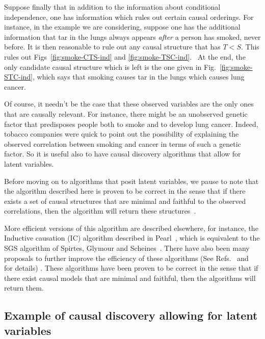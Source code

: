 \documentclass[12pt,onecolumn,nofootinbib]{revtex4-2}
\begin{document}
Suppose finally that in addition to the information about conditional
independence, one has information which rules out certain causal orderings.
For instance, in the example we are considering, suppose one has the
additional information that tar in the lungs always appears \emph{after} a
person has smoked, never before. It is then reasonable to rule out any
causal structure that has $T<S.$ This rules out Figs~\ref{fig:smoke-CTS-ind} and \ref{fig:smoke-TSC-ind}. \ At the end, the only candidate causal structure which is left is the one given in Fig.~\ref{fig:smoke-STC-ind}, which says that smoking causes tar in the lungs which causes lung cancer.

Of course, it needn't be the case that these observed variables are the only
ones that are causally relevant. For instance, there might be an unobserved genetic
factor that predisposes people both to smoke and to
develop lung cancer. Indeed, tobacco companies were quick to point out the possibility of
explaining the observed correlation between smoking and cancer in terms of
such a genetic factor. So it is useful also to have causal discovery
algorithms that allow for latent variables.

Before moving on to algorithms that posit latent variables, we pause to note
that the algorithm described here is proven to be correct in the sense
that if there exists a set of causal structures that are minimal and
faithful to the observed correlations, then the algorithm will return these structures~\cite{Wermuth1983}.


More efficient versions of this algorithm are described elsewhere, for
instance, the Inductive causation (IC) algorithm described in Pearl~\cite{Pearl2009}, which is equivalent to the SGS algorithm of Spirtes, Glymour and Scheines~\cite{Spirtes2001}. There have also been many proposals to further improve the efficiency of these algorithms (See Refs.~\cite{Pearl2009} and~\cite{Spirtes2001} for details) .  These algorithms have been proven to be correct in the sense that if there exist causal models that are minimal and faithful, then the algorithms will return them.


\subsection{Example of causal discovery allowing for latent variables}
\label{sec:causal-hvar}
\end{document}
